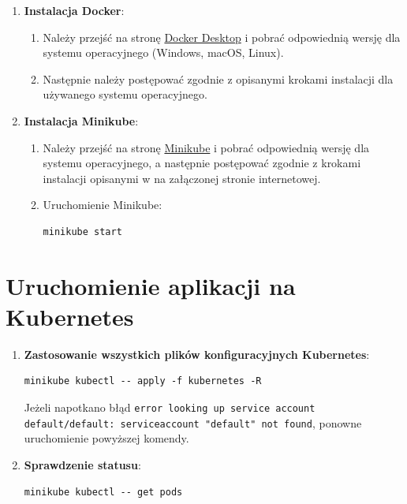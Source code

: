 \documentclass[polish]{aghengthesis}
\begin{document}
\begin{enumerate}
  \item \textbf{Instalacja Docker}:
  \begin{enumerate}
    \item Należy przejść na stronę \href{https://www.docker.com/products/docker-desktop}{Docker Desktop} i pobrać odpowiednią wersję dla systemu operacyjnego (Windows, macOS, Linux).
    \item Następnie należy postępować zgodnie z opisanymi krokami instalacji dla używanego systemu operacyjnego.
  \end{enumerate}
  \item \textbf{Instalacja Minikube}:
  \begin{enumerate}
    \item Należy przejść na stronę \href{https://minikube.sigs.k8s.io/docs/start/}{Minikube} i pobrać odpowiednią wersję dla systemu operacyjnego, a następnie postępować zgodnie z krokami instalacji opisanymi w na załączonej stronie internetowej.
    \item Uruchomienie Minikube:
\begin{lstlisting}[basicstyle=\ttfamily, numbers=none]
minikube start\end{lstlisting}
  \end{enumerate}
\end{enumerate}

\section{Uruchomienie aplikacji na Kubernetes}

\begin{enumerate}
  \item \textbf{Zastosowanie wszystkich plików konfiguracyjnych Kubernetes}:
  \begin{lstlisting}[basicstyle=\ttfamily, numbers=none]
minikube kubectl -- apply -f kubernetes -R\end{lstlisting}
  Jeżeli napotkano błąd \texttt{error looking up service account default/default: serviceaccount "default" not found}, ponowne uruchomienie powyższej komendy.

  \item \textbf{Sprawdzenie statusu}:
  \begin{lstlisting}[basicstyle=\ttfamily, numbers=none]
minikube kubectl -- get pods\end{lstlisting}
\end{enumerate}
\end{document}
